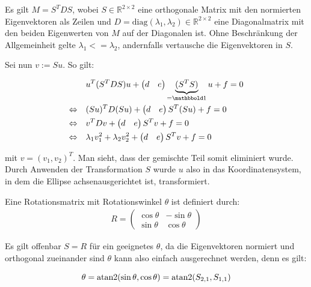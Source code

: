 Es gilt $M = S^TDS$, wobei $S\in\mathbb{R}^{2\times2}$ eine orthogonale Matrix mit den normierten Eigenvektoren als Zeilen und $D = \text{diag}(\lambda_1, \lambda_2)\in\mathbb{R}^{2\times2}$ eine Diagonalmatrix mit den beiden Eigenwerten von $M$ auf der Diagonalen ist. Ohne Beschränkung der Allgemeinheit gelte $\lambda_1 <= \lambda_2$, andernfalls vertausche die Eigenvektoren in $S$.

Sei nun $v := Su$.
So gilt:

\begin{equation} \label{eq:PCARot}
\begin{aligned}
&u^T(S^TDS)u +\begin{pmatrix}d & e\end{pmatrix}\underbrace{(S^TS)}_{=\ind}u + f = 0 \\
\Leftrightarrow\quad &(Su)^TD(Su) +\begin{pmatrix}d & e\end{pmatrix}S^T(Su) + f = 0 \\
\Leftrightarrow\quad &v^{T}Dv +\begin{pmatrix}d & e\end{pmatrix}S^Tv + f = 0 \\
\Leftrightarrow\quad &\lambda_1v_1^2 + \lambda_2v_2^2 +\begin{pmatrix}d & e\end{pmatrix}S^Tv + f = 0
\end{aligned}
\end{equation}

mit $v = (v_1,v_2)^T$. Man sieht, dass der gemischte Teil somit eliminiert wurde. Durch Anwenden der Transformation $S$ wurde $u$ also in das Koordinatensystem, in dem die Ellipse achsenausgerichtet ist,  transformiert.

Eine Rotationsmatrix mit Rotationswinkel $\theta$ ist definiert durch:
\begin{equation}
\begin{aligned}
R = \begin{pmatrix}\cos\theta & -\sin\theta \\ \sin\theta & \cos\theta\end{pmatrix}
\end{aligned}
\end{equation}

Es gilt offenbar $S = R$ für ein geeignetes $\theta$, da die Eigenvektoren normiert und orthogonal zueinander sind $\theta$ kann also einfach ausgerechnet werden, denn es gilt:

\begin{equation*}
\theta = \text{atan2}(\sin\theta, \cos\theta) = \text{atan2}(S_{2,1}, S_{1,1})
\end{equation*}

